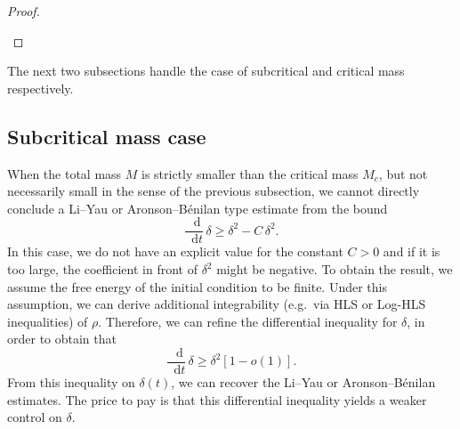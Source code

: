\documentclass[11pt,a4paper]{article}
\numberwithin{equation}{section}
\newcommand{\R}{{\mathbb{R}}}
\theoremstyle{plain}
\theoremstyle{remark}
\newcommand {\f}{\frac}
\newcommand{\diff}{\mathop{}\!\mathrm{d}}
\begin{document}
\begin{proof}
\begin{enumeratesteps}
%
\end{enumeratesteps}
\end{proof}


The next two subsections handle the case of subcritical and critical mass respectively. 

\subsection{Subcritical mass case}

When the total mass $M$ is strictly smaller than the critical mass $M_c$, but not necessarily small in the sense of the previous subsection, we cannot directly conclude a Li--Yau or Aronson--B\'enilan type estimate from the  bound
\[
    \f{\diff}{\diff t}\,\delta   \ge   \delta^2 - C\,\delta^2.
\]
In this case, we do not have an explicit value for the constant $C > 0$ and if it is too large,  the coefficient in front of $\delta^2$ might be negative.  
To obtain the result, we assume the free energy of the initial condition to be finite.  Under this assumption, we can derive additional integrability (e.g.\ via HLS or Log-HLS inequalities) of $\rho$.  
Therefore, we can refine the differential inequality for $\delta$, in order to obtain that 
\[
\f{\diff}{\diff t}\,\delta   \ge   \delta^2 \left[1 - o(1)\right].
\]
From this inequality on $\delta (t)$, we can  recover the Li--Yau or Aronson--B\'enilan estimates. The price to pay is that this differential inequality yields a weaker control on $\delta$.
\end{document}
